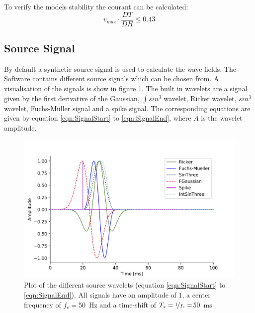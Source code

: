 \documentclass[pdftex,a4paper,parskip,listof=totoc,bibliography=totoc,onehalfspacing,12pt]{scrreprt}
\begin{document}
To verify the models stability  the courant can be calculated: 
\begin{equation*}
	v_{max} \cdot \frac{DT}{DH} \leq 0.43
\end{equation*}

\subsection{Source Signal}
By default a synthetic source signal is used to calculate the wave fields. The Software contains different source signals which can be chosen from. A visualisation of the signals is show in figure \ref{fig:Signal}. The built in wavelets are a signal given by the first derivative of the Gaussian, $\int sin^3$ wavelet, Ricker wavelet, $sin^3$ wavelet, Fuchs-M\"uller signal and a spike signal. The corresponding equations are given by equation \ref{eqn:SignalStart} to \ref{eqn:SignalEnd}, where $A$ is the wavelet amplitude.
\begin{figure}[h!]
\centering
	\includegraphics[width=.7\textwidth]{images/Signal_Plot.png}
	\caption[Plot of the different source wavelets.]{Plot of the different source wavelets (equation \ref{eqn:SignalStart} to \ref{eqn:SignalEnd}). All signals have an amplitude of $1$, a center frequency of $f_c = $\SI{50}{Hz} and a time-shift of $T_s=\nicefrac{1}{f_c}=$\SI{50}{ms}}\label{fig:Signal}
\end{figure}
\end{document}
